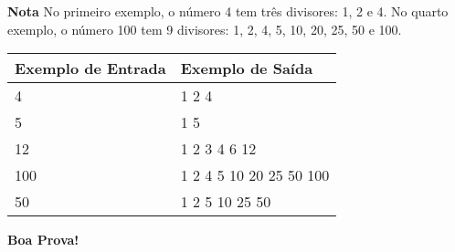 \documentclass[a4paper, 12pt]{article}
\begin{document}
\newline \newline
\textbf{{\large Nota}} \newline
No primeiro exemplo, o número 4 tem três divisores: 1, 2 e 4. \newline
No quarto exemplo, o número 100 tem 9 divisores: 1, 2, 4, 5, 10, 20, 25, 50 e 100.
\newline
\begin{table}[H]
\centering
\begin{tabular}{|l|l|}
\hline
\textbf{Exemplo de Entrada} & \textbf{Exemplo de Saída} \\ \hline
4                           & 1 2 4                     \\ \hline
5                           & 1 5                       \\ \hline
12                          & 1 2 3 4 6 12              \\ \hline
100                         & 1 2 4 5 10 20 25 50 100   \\ \hline
50                          & 1 2 5 10 25 50            \\ \hline
\end{tabular}
\end{table}
\flushright
\textbf{\Large Boa Prova!}
\end{document}
